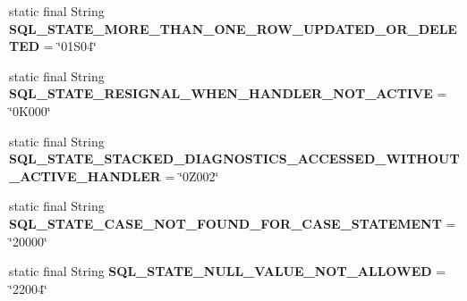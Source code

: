 \begin{DoxyCompactItemize}
\mbox{\label{classcom_1_1mysql_1_1cj_1_1exceptions_1_1_mysql_error_numbers_ac4413dc676824da64371c807b3f0db8a}} 
static final String {\bfseries S\+Q\+L\+\_\+\+S\+T\+A\+T\+E\+\_\+\+M\+O\+R\+E\+\_\+\+T\+H\+A\+N\+\_\+\+O\+N\+E\+\_\+\+R\+O\+W\+\_\+\+U\+P\+D\+A\+T\+E\+D\+\_\+\+O\+R\+\_\+\+D\+E\+L\+E\+T\+ED} = \char`\"{}01\+S04\char`\"{}
\item 
\mbox{\label{classcom_1_1mysql_1_1cj_1_1exceptions_1_1_mysql_error_numbers_a6356434a08e51944bae40eed1aef03a3}} 
static final String {\bfseries S\+Q\+L\+\_\+\+S\+T\+A\+T\+E\+\_\+\+R\+E\+S\+I\+G\+N\+A\+L\+\_\+\+W\+H\+E\+N\+\_\+\+H\+A\+N\+D\+L\+E\+R\+\_\+\+N\+O\+T\+\_\+\+A\+C\+T\+I\+VE} = \char`\"{}0\+K000\char`\"{}
\item 
\mbox{\label{classcom_1_1mysql_1_1cj_1_1exceptions_1_1_mysql_error_numbers_a1bbcc88bef35d9eff605e3262f3cd0eb}} 
static final String {\bfseries S\+Q\+L\+\_\+\+S\+T\+A\+T\+E\+\_\+\+S\+T\+A\+C\+K\+E\+D\+\_\+\+D\+I\+A\+G\+N\+O\+S\+T\+I\+C\+S\+\_\+\+A\+C\+C\+E\+S\+S\+E\+D\+\_\+\+W\+I\+T\+H\+O\+U\+T\+\_\+\+A\+C\+T\+I\+V\+E\+\_\+\+H\+A\+N\+D\+L\+ER} = \char`\"{}0\+Z002\char`\"{}
\item 
\mbox{\label{classcom_1_1mysql_1_1cj_1_1exceptions_1_1_mysql_error_numbers_a4eb831160b8329972bf6df749cea22fe}} 
static final String {\bfseries S\+Q\+L\+\_\+\+S\+T\+A\+T\+E\+\_\+\+C\+A\+S\+E\+\_\+\+N\+O\+T\+\_\+\+F\+O\+U\+N\+D\+\_\+\+F\+O\+R\+\_\+\+C\+A\+S\+E\+\_\+\+S\+T\+A\+T\+E\+M\+E\+NT} = \char`\"{}20000\char`\"{}
\item 
\mbox{\label{classcom_1_1mysql_1_1cj_1_1exceptions_1_1_mysql_error_numbers_a8de19b44aa6ae97d4c5064a543cfbd24}} 
static final String {\bfseries S\+Q\+L\+\_\+\+S\+T\+A\+T\+E\+\_\+\+N\+U\+L\+L\+\_\+\+V\+A\+L\+U\+E\+\_\+\+N\+O\+T\+\_\+\+A\+L\+L\+O\+W\+ED} = \char`\"{}22004\char`\"{}
\item 
\mbox{\label{classcom_1_1mysql_1_1cj_1_1exceptions_1_1_mysql_error_numbers_a1deccafd0110a1b872c8c01426dcc6af}} 

\end{DoxyCompactItemize}
